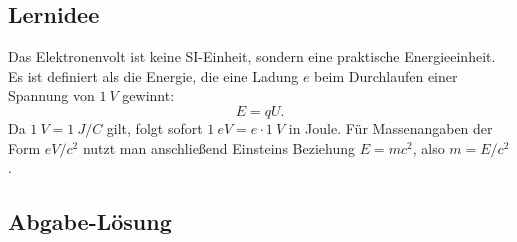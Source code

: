\documentclass[11pt,a4paper]{scrartcl}
\theoremstyle{definition}
\theoremstyle{plain}
\theoremstyle{remark}
\begin{document}
\subsection{Lernidee}

\begin{learningbox}
Das Elektronenvolt ist keine SI-Einheit, sondern eine praktische Energieeinheit. Es ist definiert als die Energie, die eine Ladung $e$ beim Durchlaufen einer Spannung von $\SI{1}{V}$ gewinnt:
\[
    E = qU.
\]
Da $\SI{1}{V}=\SI{1}{J/C}$ gilt, folgt sofort $\SI{1}{eV}=e\cdot\SI{1}{V}$ in Joule. Für Massenangaben der Form $\si{eV}/c^2$ nutzt man anschließend Einsteins Beziehung $E=mc^2$, also $m=E/c^2$.
\end{learningbox}

\subsection{Abgabe-Lösung}
\end{document}
